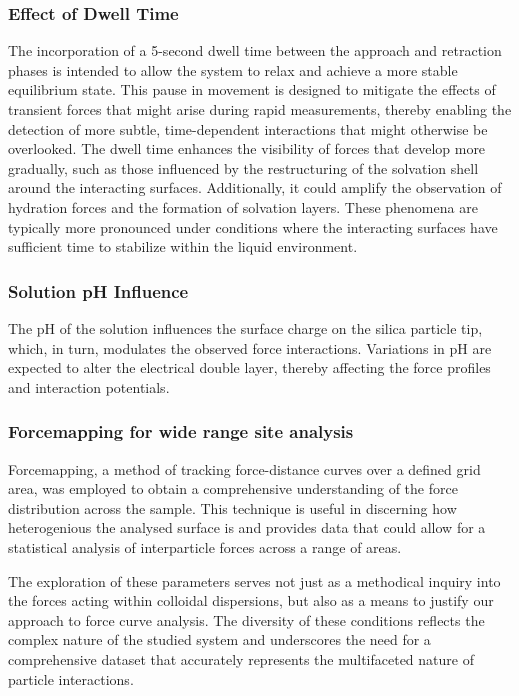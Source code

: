 \subsubsection{Effect of Dwell Time}

The incorporation of a 5-second dwell time between the approach and retraction phases is intended to allow the system to relax and achieve a more stable equilibrium state. This pause in movement is designed to mitigate the effects of transient forces that might arise during rapid measurements, thereby enabling the detection of more subtle, time-dependent interactions that might otherwise be overlooked. The dwell time enhances the visibility of forces that develop more gradually, such as those influenced by the restructuring of the solvation shell around the interacting surfaces. Additionally, it could amplify the observation of hydration forces and the formation of solvation layers. These phenomena are typically more pronounced under conditions where the interacting surfaces have sufficient time to stabilize within the liquid environment. 

\subsubsection{Solution pH Influence}

The pH of the solution influences the surface charge on the silica particle tip, which, in turn, modulates the observed force interactions. Variations in pH are expected to alter the electrical double layer, thereby affecting the force profiles and interaction potentials. 

\subsubsection{Forcemapping for wide range site analysis}

Forcemapping, a method of tracking force-distance curves over a defined grid area, was employed to obtain a comprehensive understanding of the force distribution across the sample. This technique is useful in discerning how heterogenious the analysed surface is and provides data that could allow for a statistical analysis of interparticle forces across a range of areas.

The exploration of these parameters serves not just as a methodical inquiry into the forces acting within colloidal dispersions, but also as a means to justify our approach to force curve analysis. The diversity of these conditions reflects the complex nature of the studied system and underscores the need for a comprehensive dataset that accurately represents the multifaceted nature of particle interactions.

